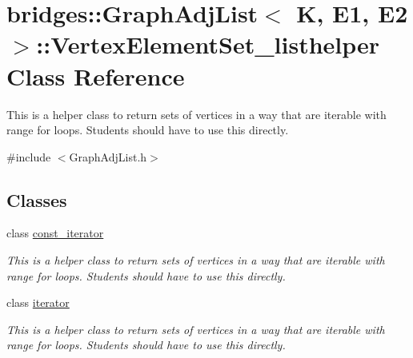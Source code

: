 \hypertarget{classbridges_1_1_graph_adj_list_1_1_vertex_element_set__listhelper}{}\section{bridges\+:\+:Graph\+Adj\+List$<$ K, E1, E2 $>$\+:\+:Vertex\+Element\+Set\+\_\+listhelper Class Reference}
\label{classbridges_1_1_graph_adj_list_1_1_vertex_element_set__listhelper}


This is a helper class to return sets of vertices in a way that are iterable with range for loops. Students should have to use this directly.  




{\ttfamily \#include $<$Graph\+Adj\+List.\+h$>$}

\subsection*{Classes}
\begin{DoxyCompactItemize}
\item 
class \hyperlink{classbridges_1_1_graph_adj_list_1_1_vertex_element_set__listhelper_1_1const__iterator}{const\+\_\+iterator}
\begin{DoxyCompactList}\small\item\em This is a helper class to return sets of vertices in a way that are iterable with range for loops. Students should have to use this directly. \end{DoxyCompactList}\item 
class \hyperlink{classbridges_1_1_graph_adj_list_1_1_vertex_element_set__listhelper_1_1iterator}{iterator}
\begin{DoxyCompactList}\small\item\em This is a helper class to return sets of vertices in a way that are iterable with range for loops. Students should have to use this directly. \end{DoxyCompactList}\end{DoxyCompactItemize}
